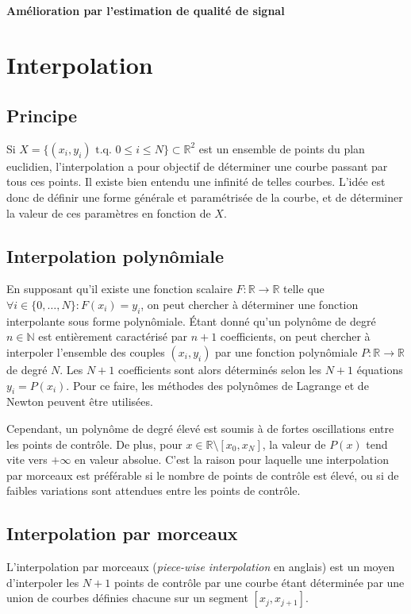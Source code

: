\documentclass[10pt,journal,compsoc]{IEEEtran}
\newcommand{\tq}{\text{ t.q. }}
\newcommand{\R}{\mathbb R}
\newcommand{\N}{\mathbb N}
\begin{document}
      \paragraph{Amélioration par l'estimation de qualité de signal}

\section{Interpolation}
  \subsection{Principe}
    Si $X = \{(x_i, y_i) \tq 0 \leq i \leq N\} \subset \R^2$ est un ensemble de points du plan euclidien, l'interpolation a pour objectif de déterminer une courbe
    passant par tous ces points. Il existe bien entendu une infinité de telles courbes. L'idée est donc de définir une forme générale et paramétrisée de la courbe,
	et de déterminer la valeur de ces paramètres en fonction de $X$.
  \subsection{Interpolation polynômiale}
    En supposant qu'il existe une fonction scalaire $F : \R \to \R$ telle que $\forall i \in \{0, \ldots, N\} : F(x_i) = y_i$, on peut chercher à déterminer une fonction
	interpolante sous forme polynômiale. Étant donné qu'un polynôme de degré $n \in \N$ est entièrement caractérisé par $n+1$ coefficients, on peut chercher à interpoler
	l'ensemble des couples $(x_i, y_i)$ par une fonction polynômiale $P : \R \to \R$ de degré $N$. Les $N+1$ coefficients sont alors déterminés selon les $N+1$ équations
	$y_i = P(x_i)$. Pour ce faire, les méthodes des polynômes de Lagrange et de Newton peuvent être utilisées.

	Cependant, un polynôme de degré élevé est soumis à de fortes oscillations entre les points de contrôle. De plus, pour $x \in \R \setminus [x_0, x_N]$, la valeur de
	$P(x)$ tend vite vers $+\infty$ en valeur absolue. C'est la raison pour laquelle une interpolation par morceaux est préférable si le nombre de points de contrôle est
	élevé, ou si de faibles variations sont attendues entre les points de contrôle.
  \subsection{Interpolation par morceaux}
    L'interpolation par morceaux (\textit{piece-wise interpolation} en anglais) est un moyen d'interpoler les $N+1$ points de contrôle par une courbe étant déterminée
	par une union de courbes définies chacune sur un segment $[x_j, x_{j+1}]$.
\end{document}
